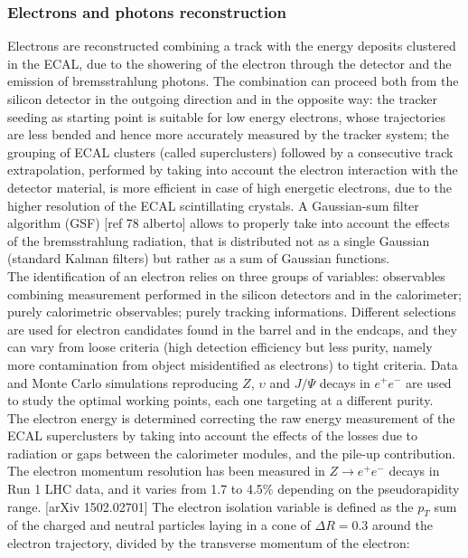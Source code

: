 \subsubsection{Electrons and photons reconstruction}
Electrons are reconstructed combining a track with the energy deposits clustered in the ECAL, due to the showering of the electron through the detector and the emission of bremsstrahlung photons. The combination can proceed both from the silicon detector in the outgoing direction and in the opposite way: the tracker seeding as starting point is suitable for low energy electrons, whose trajectories are less bended and hence more accurately measured by the tracker system; the grouping of ECAL clusters (called superclusters) followed by a consecutive track extrapolation, performed by taking into account the electron interaction with the detector material, is more efficient in case of high energetic electrons, due to the higher resolution of the ECAL scintillating crystals. A Gaussian-sum filter algorithm (GSF) [ref 78 alberto] allows to properly take into account the effects of the bremsstrahlung radiation, that is distributed not as a single Gaussian (standard Kalman filters) but rather as a sum of Gaussian functions.\\
The identification of an electron relies on three groups of variables: observables combining measurement performed in the silicon detectors and in the calorimeter; purely calorimetric observables; purely tracking informations. Different selections are used for electron candidates found in the barrel and in the endcaps, and they can vary from loose criteria (high detection efficiency but less purity, namely more contamination from object misidentified as electrons) to tight criteria. Data and Monte Carlo simulations reproducing $Z$, $\upsilon$ and $J/\Psi$ decays in $e^+ e^-$ are used to study the optimal working points, each one targeting at a different purity.\\
The electron energy is determined correcting the raw energy measurement of the ECAL superclusters by taking into account the effects of the losses due to radiation or gaps between the calorimeter modules, and the pile-up contribution. The electron momentum resolution has been measured in $Z \rightarrow e^+ e^-$ decays in Run 1 LHC data, and it varies from 1.7 to 4.5\% depending on the pseudorapidity range. [arXiv 1502.02701]%
The electron isolation variable is defined as the $p_T$ sum of the charged and neutral particles laying in a cone of $\Delta R = 0.3$ around the electron trajectory, divided by the transverse momentum of the electron:
